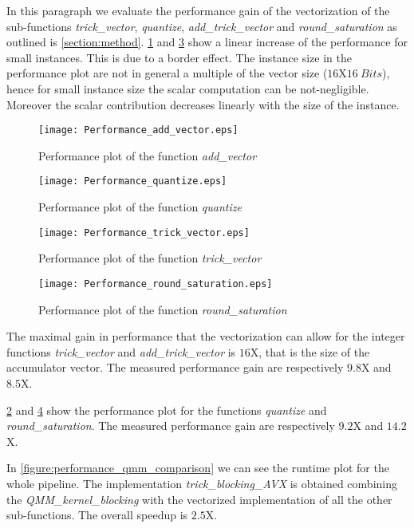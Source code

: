 
In this paragraph we evaluate the performance gain of the vectorization of the sub-functions \emph{trick\_vector}, \emph{quantize}, \emph{add\_trick\_vector} and \emph{round\_saturation} as outlined is \cref{section:method}. \cref{figure:performance_add_vector} and \cref{figure:performance_trick_vector} show a linear increase of the performance for small instances. This is due to a border effect. The instance size in the  performance plot are not in general a multiple of the vector size ($16$X$16 \ Bits$), hence for small instance size the scalar computation can be not-negligible. Moreover the scalar contribution decreases linearly with the size of the instance.

\begin{figure}[h]
\texttt{[image: Performance\_add\_vector.eps]}
\caption{Performance plot of the function \emph{add\_vector}}
\label{figure:performance_add_vector}
\end{figure}

\begin{figure}
	\texttt{[image: Performance\_quantize.eps]}
	\caption{Performance plot of the function \emph{quantize}}
	\label{figure:performance_quantize}
\end{figure}

\begin{figure}
\texttt{[image: Performance\_trick\_vector.eps]}
\caption{Performance plot of the function \emph{trick\_vector}}
\label{figure:performance_trick_vector}
\end{figure}

\begin{figure}
\texttt{[image: Performance\_round\_saturation.eps]}
\caption{Performance plot of the function \emph{round\_saturation}}
\label{figure:performance_round_saturation}
\end{figure}

The maximal gain in performance that the vectorization can allow for the integer functions \emph{trick\_vector} and \emph{add\_trick\_vector} is $16$X, that is the size of the accumulator vector. The measured performance gain are respectively  $9.8$X and $8.5$X.

\cref{figure:performance_quantize} and \cref{figure:performance_round_saturation} show the performance plot for the functions \emph{quantize} and \emph{round\_saturation}. The measured performance gain are respectively $9.2$X and $14.2$X. 

In \cref{figure:performance_qmm_comparison} we can see the runtime plot for the whole pipeline. The implementation \emph{trick\_blocking\_AVX} is obtained combining the \emph{QMM\_kernel\_blocking} with the vectorized implementation of all the other sub-functions. The overall speedup is $2.5$X.